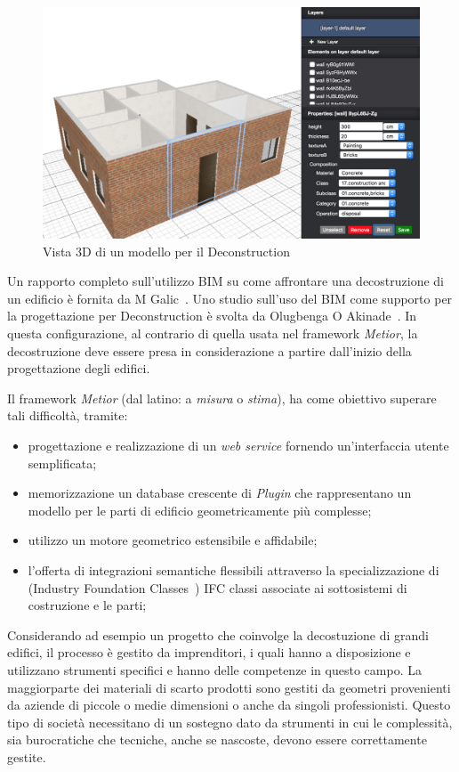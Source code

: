 \begin{figure}[htbp] %
   \centering
   \includegraphics[width=1\linewidth]{images/3d-sel}
   \caption{Vista 3D di un modello per il Deconstruction}
   \label{fig:augmented}
\end{figure}

Un rapporto completo sull'utilizzo BIM su come affrontare una decostruzione di un edificio è fornita da M Galic~\cite{galic2014bim}.
Uno studio sull'uso del BIM come supporto per la progettazione per Deconstruction è svolta da Olugbenga O Akinade~\cite{akinade2015waste}.
In questa configurazione, al contrario di quella usata nel framework \emph{Metior}, la decostruzione deve essere
presa in considerazione a partire dall'inizio della progettazione degli edifici.
\newpage


Il framework \emph{Metior} (dal latino: a \emph{misura} o \emph{stima}),
ha come obiettivo superare tali difficoltà, tramite:
\begin{itemize}
  \item progettazione e realizzazione di un \emph{web service} fornendo un'interfaccia utente semplificata;
  \item memorizzazione un database crescente di \emph{Plugin} che rappresentano un modello per le parti di edificio geometricamente più complesse;
  \item utilizzo un motore geometrico estensibile e affidabile;
  \item l'offerta di integrazioni semantiche flessibili attraverso la specializzazione di (Industry Foundation Classes~\cite{ifc})
        IFC classi associate ai sottosistemi di costruzione e le parti;
\end{itemize}

Considerando ad esempio un progetto che coinvolge la decostuzione di grandi edifici, il processo è
gestito da imprenditori, i quali hanno a disposizione e utilizzano strumenti specifici e hanno delle competenze in questo campo.
La maggiorparte dei materiali di scarto prodotti sono gestiti da geometri provenienti da aziende di piccole o medie dimensioni
o anche da singoli professionisti.
Questo tipo di società necessitano di un sostegno dato da strumenti in cui le complessità,
sia burocratiche che tecniche, anche se nascoste, devono essere correttamente gestite.\\
